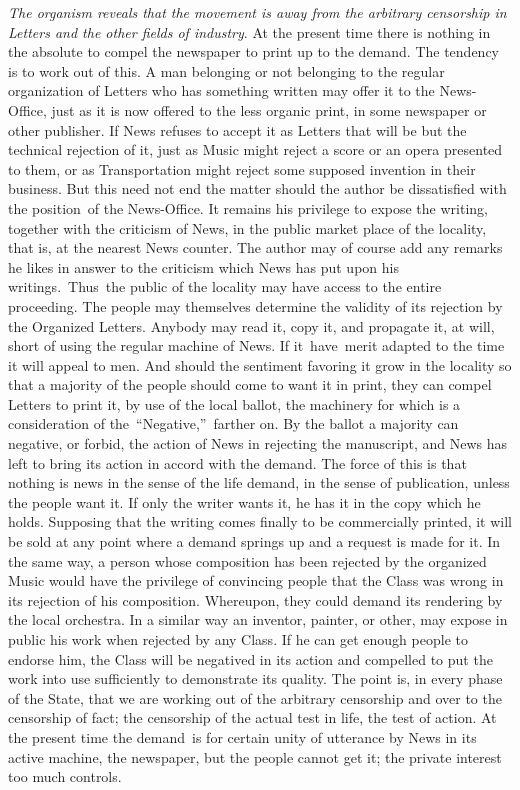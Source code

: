 \documentclass[twoside,symmetric,nobib,justified]{tufte-book}
\begin{document}
\vspace{0.05in}

\emph{The organism reveals that the movement is away from the arbitrary
censorship in Letters and the other fields of industry}. At the present
time there is nothing in the absolute to compel the newspaper to print
up to the demand. The tendency is to work out of this. A man belonging
or not belonging to the regular organization of Letters who has
something written may offer it to the News-Office, just as it is now
offered to the less organic print, in some newspaper or other publisher.
If News refuses to accept it as Letters that will be but the technical
rejection of it, just as Music might reject a score or an opera
presented to them, or as Transportation might reject some supposed
invention in their business. But this need not end the matter should the
author be dissatisfied with the position~of the News-Office. It remains
his privilege to expose the writing, together with the criticism of
News, in the public market place of the locality, that is, at the
nearest News counter. The author may of course add any remarks he likes
in answer to the criticism which News has put upon his
writings.~Thus~the public of the locality may have access to the entire
proceeding. The people may themselves determine the validity of its
rejection by the Organized Letters. Anybody may read it, copy it, and
propagate it, at will, short of using the regular machine of News. If
it~have~merit adapted to the time it will appeal to men. And should the
sentiment favoring it grow in the locality so that a majority of the
people should come to want it in print, they can compel Letters to print
it, by use of the local ballot, the machinery for which is a
consideration of the~``Negative,''~farther on. By the ballot a majority
can negative, or forbid, the action of News in rejecting the manuscript,
and News has left to bring its action in accord with the demand. The
force of this is that nothing is news in the sense of the life demand,
in the sense of publication, unless the people want it. If only the
writer wants it, he has it in the copy which he holds. Supposing that
the writing comes finally to be commercially printed, it will be sold at
any point where a demand springs up and a request is made for it. In the
same way, a person whose composition has been rejected by the organized
Music would have the privilege of convincing people that the Class was
wrong in its rejection of his composition. Whereupon, they could demand
its rendering by the local orchestra. In a similar way an inventor,
painter, or other, may expose in public his work when rejected by any
Class. If he can get enough people to endorse him, the Class will be
negatived in its action and compelled to put the work into use
sufficiently to demonstrate its quality. The point is, in every phase of
the State, that we are working out of the arbitrary censorship and over
to the censorship of fact; the censorship of the actual test in life,
the test of action. At the present time the demand~is for certain unity
of utterance by News in its active machine, the newspaper, but the
people cannot get it; the private interest too much controls.~
\end{document}
